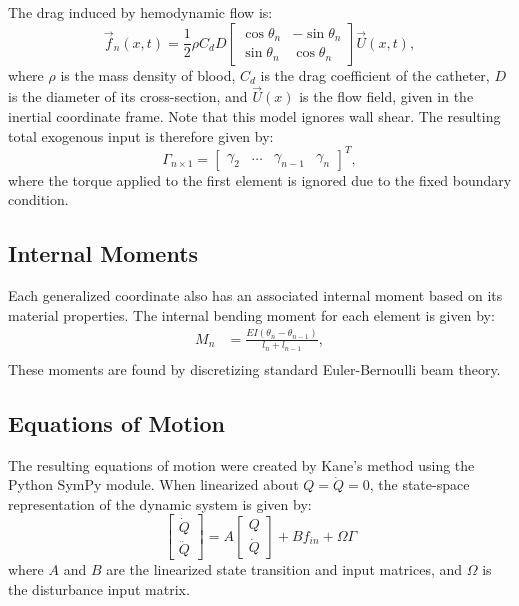 \documentclass[letterpaper,10pt,conference]{ieeeconf}   %
\begin{document}
The drag induced by hemodynamic flow is:
%
\begin{equation}
\vec{f}_n(x,t) = \frac{1}{2}\rho C_d D 
\begin{bmatrix}
\cos{\theta_n} & -\sin{\theta_n} \\
\sin{\theta_n} & \cos{\theta_n}
\end{bmatrix}
\vec{U}(x,t),
\end{equation}
where $\rho$ is the mass density of blood, $C_d$ is the drag coefficient of the catheter, $D$ is the diameter of its cross-section, and $\vec{U}(x)$ is the flow field, given in the inertial coordinate frame. Note that this model ignores wall shear. The resulting total exogenous input is therefore given by:
%
\begin{equation}
\label{eq:Gamma}
\Gamma_{n \times 1} = 
\begin{bmatrix}
\gamma_{2} &  
\dots & 
\gamma_{n-1} & 
\gamma_{n}
\end{bmatrix}^T,
\end{equation}
%
where the torque applied to the first element is ignored due to the fixed boundary condition.

\subsection{Internal Moments}
\label{sec:internal_forces}

Each generalized coordinate also has an associated internal moment based on its material properties. The internal bending moment for each element is given by:
%
\begin{equation}
\begin{aligned}
\label{eq:m_z}
M_{n} &= \frac{EI (\theta_{n} - \theta_{n-1})}{l_n + l_{n-1}}, \\
\end{aligned}
\end{equation}
%
These moments are found by discretizing standard Euler-Bernoulli beam theory. 

\subsection{Equations of Motion}
\label{sec:equationsmotion}

The resulting equations of motion were created by Kane's method using the Python SymPy module. When linearized about $Q=\dot{Q}=0$, the state-space representation of the dynamic system is given by:
%
\begin{equation}
\label{eq:eqmotion}
\begin{bmatrix}
 \dot{Q}\\
 \ddot{Q}
\end{bmatrix}
=
A
\begin{bmatrix}
 Q\\
 \dot{Q}
\end{bmatrix}
+
B f_{in}
+
\Omega \Gamma
\end{equation} 
%
where $A$ and $B$ are the linearized state transition and input matrices, and $\Omega$ is the disturbance input matrix.  
\end{document}
